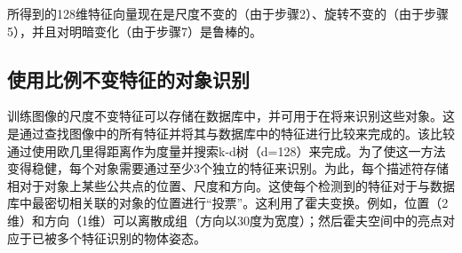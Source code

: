 
所得到的128维特征向量现在是尺度不变的（由于步骤2）、旋转不变的（由于步骤5），并且对明暗变化（由于步骤7）是鲁棒的。


\subsection{使用比例不变特征的对象识别}

训练图像的尺度不变特征可以存储在数据库中，并可用于在将来识别这些对象。这是通过查找图像中的所有特征并将其与数据库中的特征进行比较来完成的。该比较通过使用欧几里得距离作为度量并搜索k-d树（d=128）来完成。为了使这一方法变得稳健，每个对象需要通过至少3个独立的特征来识别。为此，每个描述符存储相对于对象上某些公共点的位置、尺度和方向。这使每个检测到的特征对于与数据库中最密切相关联的对象的位置进行“投票”。这利用了霍夫变换。例如，位置（2维）和方向（1维）可以离散成组（方向以30度为宽度）；然后霍夫空间中的亮点对应于已被多个特征识别的物体姿态。

